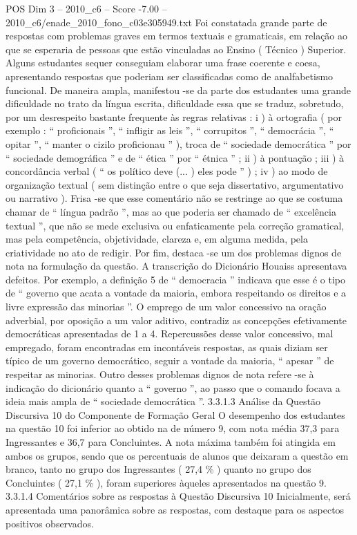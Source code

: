 \begin{textsample}{POS Dim 3 – 2010\_c6 – Score -7.00 – 2010\_c6/enade\_2010\_fono\_c03e305949.txt}
Foi constatada grande parte de respostas com problemas graves em termos textuais e gramaticais, em relação ao que se esperaria de pessoas que estão vinculadas ao Ensino ( Técnico ) Superior.
Alguns estudantes sequer conseguiam elaborar uma frase coerente e coesa, apresentando respostas que poderiam ser classificadas como de analfabetismo funcional.
De maneira ampla, manifestou -se da parte dos estudantes uma grande dificuldade no trato da língua escrita, dificuldade essa que se traduz, sobretudo, por um desrespeito bastante frequente às regras relativas : i ) à ortografia ( por exemplo : “ proficionais ”, “ infligir as leis ”, “ corrupitos ”, “ democrácia ”, “ opitar ”, “ manter o cizilo proficionau ” ), troca de “ sociedade democrática ” por “ sociedade demográfica ” e de “ ética ” por “ étnica ” ; ii ) à pontuação ; iii ) à concordância verbal ( “ os político deve (... ) eles pode ” ) ; iv ) ao modo de organização textual ( sem distinção entre o que seja dissertativo, argumentativo ou narrativo ).
Frisa -se que esse comentário não se restringe ao que se costuma chamar de “ língua padrão ”, mas ao que poderia ser chamado de “ excelência textual ”, que não se mede exclusiva ou enfaticamente pela correção gramatical, mas pela competência, objetividade, clareza e, em alguma medida, pela criatividade no ato de redigir.
Por fim, destaca -se um dos problemas dignos de nota na formulação da questão.
A transcrição do Dicionário Houaiss apresentava defeitos.
Por exemplo, a definição 5 de “ democracia ” indicava que esse é o tipo de “ governo que acata a vontade da maioria, embora respeitando os direitos e a livre expressão das minorias ”.
O emprego de um valor concessivo na oração adverbial, por oposição a um valor aditivo, contradiz as concepções efetivamente democráticas apresentadas de 1 a 4.
Repercussões desse valor concessivo, mal empregado, foram encontradas em incontáveis respostas, as quais diziam ser típico de um governo democrático, seguir a vontade da maioria, “ apesar ” de respeitar as minorias.
Outro desses problemas dignos de nota refere -se à indicação do dicionário quanto a “ governo ”, ao passo que o comando focava a ideia mais ampla de “ sociedade democrática ”. 3.3.1.3 Análise da Questão Discursiva 10 do Componente de Formação Geral O desempenho dos estudantes na questão 10 foi inferior ao obtido na de número 9, com nota média 37,3 para Ingressantes e 36,7 para Concluintes.
A nota máxima também foi atingida em ambos os grupos, sendo que os percentuais de alunos que deixaram a questão em branco, tanto no grupo dos Ingressantes ( 27,4 \% ) quanto no grupo dos Concluintes ( 27,1 \% ), foram superiores àqueles apresentados na questão 9. 3.3.1.4 Comentários sobre as respostas à Questão Discursiva 10 Inicialmente, será apresentada uma panorâmica sobre as respostas, com destaque para os aspectos positivos observados.

\end{textsample}
